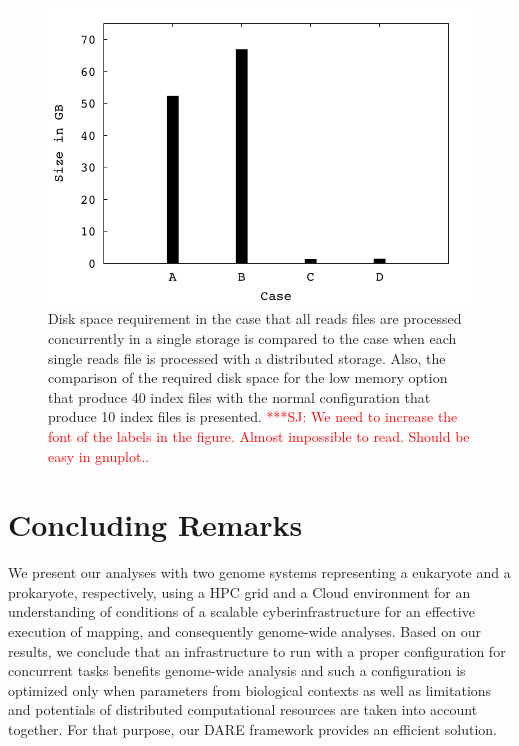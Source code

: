 \documentclass[12pt]{article}
\newcommand{\jhanote}[1]{ {\textcolor{red}     {***SJ: #1}}}
\newcommand{\jhanote}[1]{}
\begin{document}
\begin{figure}
 \centering
\includegraphics[scale=0.66]{figures/diskspace.pdf}

\caption{\small Disk space requirement in the case that all reads
  files are processed concurrently in a single storage is compared to
  the case when each single reads file is processed with a distributed
  storage.  Also, the comparison of the required disk space for the
  low memory option that produce 40 index files with the normal
  configuration that produce 10 index files is presented. \jhanote{We
    need to increase the font of the labels in the figure. Almost
    impossible to read. Should be easy in gnuplot..}}
  \label{fig:diskspace} 
 \end{figure}


\section{Concluding Remarks}
We present our analyses with two genome systems representing a eukaryote and a prokaryote, respectively, using
 a HPC grid and a Cloud environment for an understanding of conditions of a scalable cyberinfrastructure for an effective execution of
 mapping, and consequently genome-wide analyses.   Based on our results, we conclude that an infrastructure to run with a proper configuration for concurrent tasks benefits genome-wide analysis and such a configuration is optimized only when parameters from biological contexts as well as limitations and potentials of distributed computational resources are taken into account together.  For that purpose, our DARE framework provides an efficient solution.  





\end{document}
